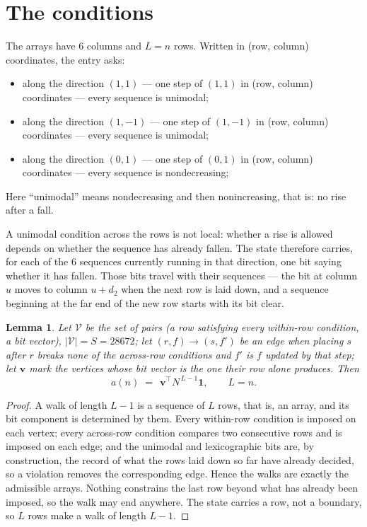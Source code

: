\documentclass[11pt,a4paper]{article}
\theoremstyle{plain}
\newtheorem{lemma}[theorem]{Lemma}
\theoremstyle{definition}
\begin{document}
\section{The conditions}

The arrays have $6$ columns and $L=n$ rows. Written in (row, column)
coordinates, the entry asks:
\begin{itemize}
\item along the direction $(1,1)$ --- one step of $(1,1)$ in (row, column) coordinates --- every sequence is unimodal;
\item along the direction $(1,-1)$ --- one step of $(1,-1)$ in (row, column) coordinates --- every sequence is unimodal;
\item along the direction $(0,1)$ --- one step of $(0,1)$ in (row, column) coordinates --- every sequence is nondecreasing;
\end{itemize}
Here ``unimodal'' means nondecreasing and then nonincreasing, that is: no rise after a fall.

A unimodal condition across the rows is not local: whether a
rise is allowed depends on whether the sequence has already fallen. The state therefore
carries, for each of the $6$ sequences currently running in that direction, one bit saying
whether it has fallen. Those bits travel with their sequences --- the bit at column $u$
moves to column $u+d_2$ when the next row is laid down, and a sequence beginning at the
far end of the new row starts with its bit clear.

\begin{lemma}\label{lem:walk}
Let $\mathcal V$ be the set of pairs (a row satisfying every within-row condition, a
bit vector), $|\mathcal V|=S=28672$; let $(r,f)\to(s,f')$ be an edge when placing $s$ after $r$
breaks none of the across-row conditions and $f'$ is $f$ updated by that step; let
$\mathbf{v}$ mark the vertices whose bit vector is the one their row alone produces.
Then
\[
a(n)\;=\;\,\mathbf{v}^{\!\top}N^{\,L-1}\mathbf{1},\qquad L=n.
\]
\end{lemma}

\begin{proof}
A walk of length $L-1$ is a sequence of $L$ rows, that is, an array, and its bit component
is determined by them. Every within-row condition is imposed on each vertex; every
across-row condition compares two consecutive rows and is imposed on each edge; and the
unimodal and lexicographic bits are, by construction, the record of what the rows laid down
so far have already decided, so a violation removes the corresponding edge. Hence the walks
are exactly the admissible arrays. Nothing constrains the last row beyond what has already
been imposed, so the walk may end anywhere. The state carries a row, not a boundary, so
$L$ rows make a walk of length $L-1$.
\end{proof}
\end{document}
